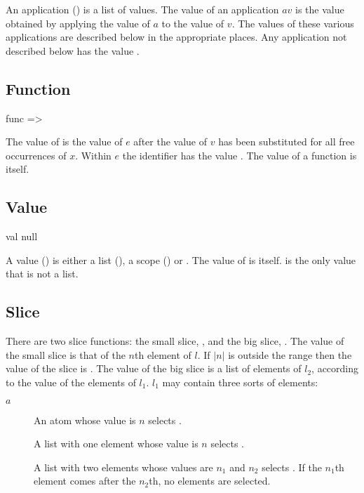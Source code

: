 \documentclass[english]{article}
\newcommand{\cont}{\noindent}
\begin{document}
\cont An application () is a list of values. The value of an
application $av$ is the value obtained by applying the value of $a$ to
the value of $v$. The values of these various applications are
described below in the appropriate places. Any application not
described below has the value .


\subsection{Function}

\begin{bnfc}
\item[func] => 
\end{bnfc}

\cont The value of  is the value of $e$ after
the value of $v$ has been substituted for all free occurrences of $x$.
Within $e$ the identifier \conc{<=} has the value \mbox{}. The value of a function is itself.


\subsection{Value}

\begin{bnfc}
\item[val]\Alt{}\Alt null
\end{bnfc}

\cont A value () is either a list (), a scope
() or . The value of  is itself.
 is the only value that is not a list.


\subsection{Slice}

There are two slice functions: the small slice, \conc{\$}, and the big
slice, \conc{\$\$}. The value of the small slice  is that
of the $n$th element of $l$. If $|n|$ is outside the range
 then the value of the slice is . The
value of the big slice  is a list of elements of
$l_2$, according to the value of the elements of $l_1$. $l_1$ may
contain three sorts of elements:

\begin{description}
\item[$a$]An atom whose value is $n$ selects .
\item[\conc{[$a_1$]}]A list with one element whose value is $n$
  selects .
\item[\conc{[$a_1$,$a_2$]}]A list with two elements whose values are
  $n_1$ and $n_2$ selects . If the
  $n_1$th element comes after the $n_2$th, no elements are selected.
\end{description}
\end{document}
